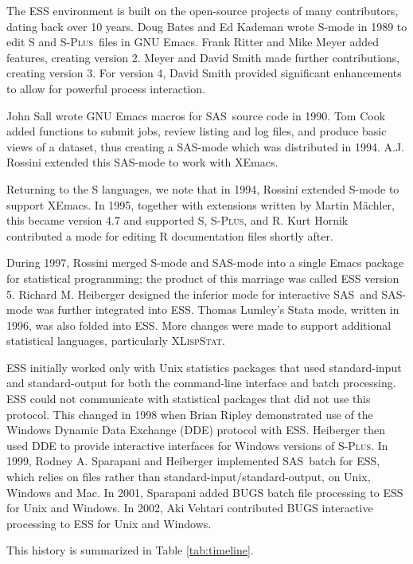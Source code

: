 \documentclass{article}
\newcommand*{\SAS}{\textsc{SAS}}
\newcommand*{\Splus}{\textsc{S-Plus}}
\newcommand*{\XLispStat}{\textsc{XLispStat}}
\begin{document}
The ESS environment is built on the open-source projects of many
contributors, dating back over 10 years.  Doug Bates and Ed Kademan
wrote S-mode in 1989 to edit S and \Splus\ files in GNU Emacs.  Frank
Ritter and Mike Meyer added features, creating version 2.  Meyer and
David Smith made further contributions, creating version 3.  For
version 4, David Smith provided significant enhancements to allow for
powerful process interaction.

John Sall wrote GNU Emacs macros for \SAS\ source code in 1990.  Tom
Cook added functions to submit jobs, review listing and log files, and
produce basic views of a dataset, thus creating a SAS-mode which was
distributed in 1994.  A.J. Rossini extended this SAS-mode to work with
XEmacs.

Returning to the S languages, we note that in 1994, Rossini extended
S-mode to support XEmacs.  In 1995, together with extensions written
by Martin M{\"a}chler, this became version 4.7 and supported S, \Splus,
and R.  Kurt Hornik contributed a mode for editing R documentation
files shortly after.

During 1997, Rossini merged S-mode and SAS-mode into a single Emacs
package for statistical programming; the product of this marriage was
called ESS version 5.  Richard M. Heiberger designed the inferior mode
for interactive \SAS\ and SAS-mode was further integrated into ESS.
Thomas Lumley's Stata mode, written in 1996, was also folded into ESS.
More changes were made to support additional statistical languages,
particularly \XLispStat.

ESS initially worked only with Unix statistics packages that used
standard-input and standard-output for both the command-line interface
and batch processing.  ESS could not communicate with statistical
packages that did not use this protocol.  This changed in 1998 when
Brian Ripley demonstrated use of the Windows Dynamic Data Exchange
(DDE) protocol with ESS.  Heiberger then used DDE to provide
interactive interfaces for Windows versions of \Splus.  In 1999,
Rodney A. Sparapani and Heiberger implemented \SAS\ batch for ESS,
which relies on files rather than standard-input/standard-output, on
Unix, Windows and Mac.  In 2001, Sparapani added BUGS batch file
processing to ESS for Unix and Windows.  In 2002, Aki Vehtari
contributed BUGS interactive processing to ESS for Unix and Windows.

This history is summarized in Table \ref{tab:timeline}.
\end{document}
